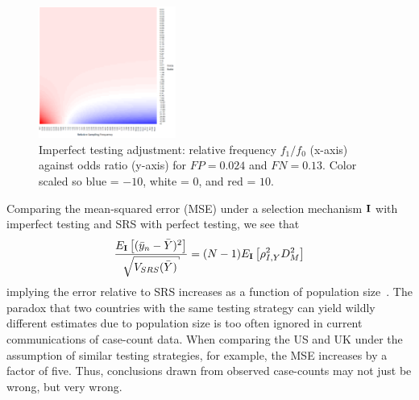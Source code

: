 \documentclass[11pt]{amsart}
\numberwithin{equation}{section}
\theoremstyle{plain}
\def\I{\bf I}
\begin{document}
\begin{figure}[!th]
\centering
\includegraphics[width = 0.4\textwidth]{../figs/mem_heatmap_article.png}
\caption{Imperfect testing adjustment: relative frequency $f_1/f_0$ (x-axis) against odds ratio (y-axis) for $FP=0.024$ and $FN=0.13$. Color scaled so blue = $-10$, white = $0$, and red = $10$.}
\label{fig:heatmap}
\vspace{-0.3cm}
\end{figure}

Comparing the mean-squared error (MSE) under a selection mechanism $\I$ with imperfect testing and SRS with perfect testing, we see that
$$
\frac{E_{\I} \left[ (\bar y_n - \bar Y)^2 \right]}{\sqrt{V_{SRS} (\bar Y)}} = (N-1) E_{\I} \left[ \rho_{I,Y}^2 D_M^2 \right]
$$
implying the error relative to SRS increases as a function of population size~\citep{Meng2018}. The paradox that two countries with the same testing strategy can yield wildly different estimates due to population size is too often ignored in current communications of case-count data.  When comparing the US and UK under the assumption of similar testing strategies, for example, the MSE increases by a factor of five.  Thus, conclusions drawn from observed case-counts may not just be wrong, but very wrong.
\end{document}
